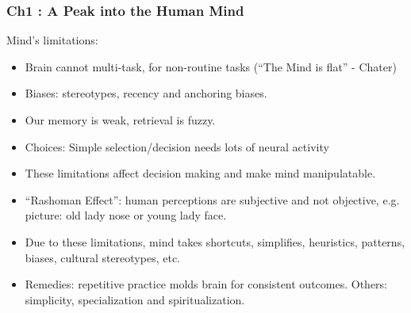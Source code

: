 \begin{frame}[fragile]\frametitle{Ch1 : A Peak into the Human Mind}
Mind's limitations:
\begin{itemize}
\item Brain cannot multi-task, for non-routine tasks (``The Mind is flat'' - Chater)
\item Biases: stereotypes, recency and anchoring biases.
\item Our memory is weak, retrieval is fuzzy.
\item Choices: Simple selection/decision needs lots of neural activity
\item These limitations affect decision making and make mind manipulatable.
\item ``Rashoman Effect'': human perceptions are subjective and not objective, e.g. picture: old lady nose or young lady face.
\item Due to these limitations, mind takes shortcuts, simplifies, heuristics, patterns, biases, cultural stereotypes, etc.
\item Remedies: repetitive practice molds brain for consistent outcomes. Others: simplicity, specialization and spiritualization.
\end{itemize}

\end{frame}

